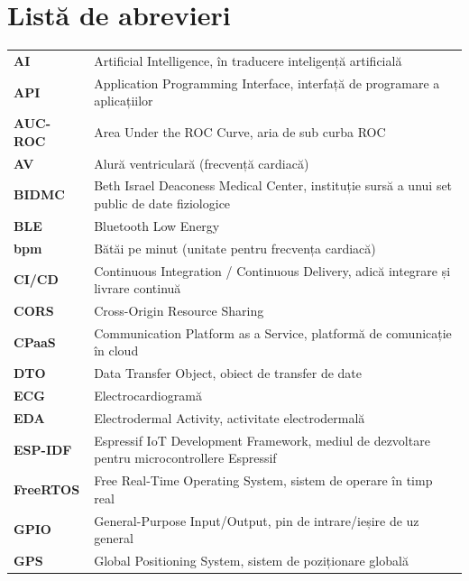 ﻿\documentclass[12pt,a4paper,twoside]{article}
\begin{document}


\newpage
\tableofcontents
\newpage

{}
\listoffigures
\newpage

{}
\listoftables
\newpage

{}
\section*{Listă de abrevieri}

{\small
\renewcommand{\arraystretch}{1.25}
\begin{longtable}{@{}>{\bfseries}p{2.7cm}p{10.6cm}@{}}
AI & Artificial Intelligence, în traducere inteligență artificială\\
API & Application Programming Interface, interfață de programare a aplicațiilor\\
AUC-ROC & Area Under the ROC Curve, aria de sub curba ROC\\
AV & Alură ventriculară (frecvență cardiacă)\\
BIDMC & Beth Israel Deaconess Medical Center, instituție sursă a unui set public de date fiziologice\\
BLE & Bluetooth Low Energy\\
bpm & Bătăi pe minut (unitate pentru frecvența cardiacă)\\
CI/CD & Continuous Integration / Continuous Delivery, adică integrare și livrare continuă\\
CORS & Cross-Origin Resource Sharing\\
CPaaS & Communication Platform as a Service, platformă de comunicație în cloud\\
DTO & Data Transfer Object, obiect de transfer de date\\
ECG & Electrocardiogramă\\
EDA & Electrodermal Activity, activitate electrodermală\\
ESP-IDF & Espressif IoT Development Framework, mediul de dezvoltare pentru microcontrollere Espressif\\
FreeRTOS & Free Real-Time Operating System, sistem de operare în timp real\\
GPIO & General-Purpose Input/Output, pin de intrare/ieșire de uz general\\
GPS & Global Positioning System, sistem de poziționare globală\\

\end{longtable}}
\end{document}
